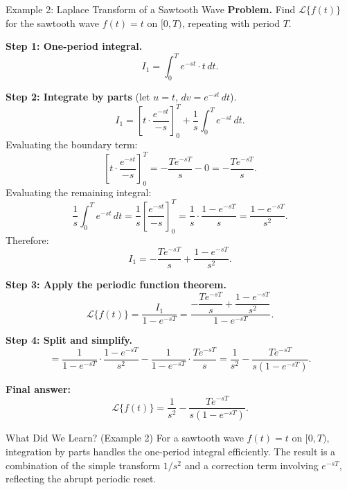 \documentclass[12pt,a4paper]{article}
\begin{document}
\begin{infobox}{Example 2: Laplace Transform of a Sawtooth Wave}
\textbf{Problem.} Find $\mathcal{L}\{f(t)\}$ for the sawtooth wave
$f(t) = t$ on $[0, T)$, repeating with period $T$.

\textbf{Step 1: One-period integral.}
\[
  I_1 = \int_0^T e^{-st} \cdot t\,dt.
\]

\textbf{Step 2: Integrate by parts} (let $u = t$, $dv = e^{-st}\,dt$).
\[
  I_1 = \left[t \cdot \frac{e^{-st}}{-s}\right]_0^T
        + \frac{1}{s}\int_0^T e^{-st}\,dt.
\]
Evaluating the boundary term:
\[
  \left[t \cdot \frac{e^{-st}}{-s}\right]_0^T
  = -\frac{T e^{-sT}}{s} - 0 = -\frac{T e^{-sT}}{s}.
\]
Evaluating the remaining integral:
\[
  \frac{1}{s}\int_0^T e^{-st}\,dt
  = \frac{1}{s}\left[\frac{e^{-st}}{-s}\right]_0^T
  = \frac{1}{s}\cdot\frac{1 - e^{-sT}}{s}
  = \frac{1 - e^{-sT}}{s^2}.
\]
Therefore:
\[
  I_1 = -\frac{T e^{-sT}}{s} + \frac{1 - e^{-sT}}{s^2}.
\]

\textbf{Step 3: Apply the periodic function theorem.}
\[
  \mathcal{L}\{f(t)\}
  = \frac{I_1}{1 - e^{-sT}}
  = \frac{-\dfrac{T e^{-sT}}{s} + \dfrac{1 - e^{-sT}}{s^2}}{1 - e^{-sT}}.
\]

\textbf{Step 4: Split and simplify.}
\[
  = \frac{1}{1 - e^{-sT}} \cdot \frac{1 - e^{-sT}}{s^2}
    - \frac{1}{1 - e^{-sT}} \cdot \frac{T e^{-sT}}{s}
  = \frac{1}{s^2} - \frac{T e^{-sT}}{s(1 - e^{-sT})}.
\]

\textbf{Final answer:}
\[
  \mathcal{L}\{f(t)\} = \frac{1}{s^2} - \frac{T e^{-sT}}{s(1 - e^{-sT})}.
\]
\end{infobox}

\begin{learnbox}{What Did We Learn? (Example 2)}
For a sawtooth wave $f(t) = t$ on $[0,T)$, integration by parts handles the
one-period integral efficiently. The result is a combination of the simple
transform $1/s^2$ and a correction term involving $e^{-sT}$, reflecting the
abrupt periodic reset.
\end{learnbox}
\end{document}
